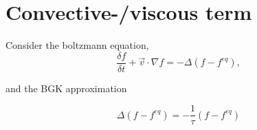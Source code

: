 


\section{Convective-/viscous term}

Consider the boltzmann equation, 
\begin{equation}
    \frac{\delta f}{\delta t} + \vec{v}\cdot\nabla{f} = -\Delta(f-f^{eq}),
\end{equation}

and the BGK approximation

\begin{equation}
    \Delta (f - f^{eq}) = -\frac{1}{\tau}(f - f^{eq})
\end{equation}

